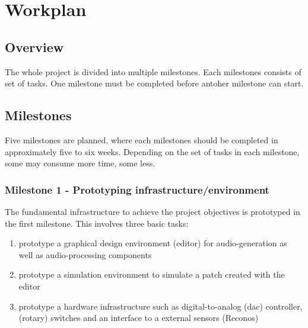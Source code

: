 
\chapter{Workplan}


\section{Overview}


The whole project is divided into multiple milestones. Each milestones consists of set of tasks. One milestone must be completed before antoher milestone can start.

\section{Milestones}

Five milestones are planned, where each milestones should be completed in approximately five to six weeks. Depending on the set of tasks in each milestone, some may consume more time, some less.

\subsection{Milestone 1 - Prototyping infrastructure/environment}

The fundamental infrastructure to achieve the project objectives is prototyped in the first milestone. This involves three basic tasks:

\begin{enumerate}
	\item prototype a graphical design environment (editor) for audio-generation as well as audio-processing components
	\item prototype a simulation environment to simulate a patch created with the editor
	\item prototype a hardware infrastructure such as digital-to-analog (dac) controller, (rotary) switches and an interface to a external sensors (Reconos)
\end{enumerate}

